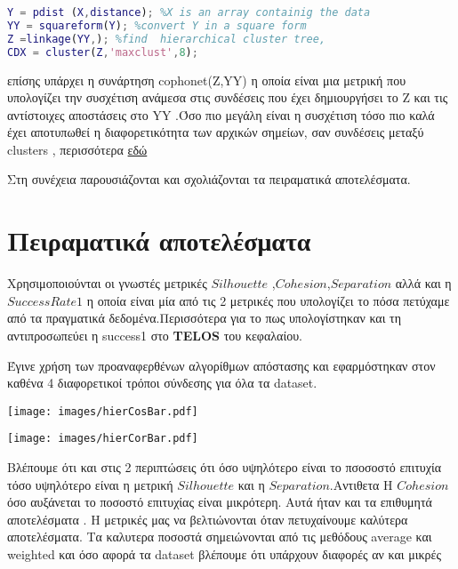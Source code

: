 \begin{lstlisting}[language=Matlab]
%simple example of hierarchical clustering
Y = pdist (X,distance); %X is an array containig the data
YY = squareform(Y); %convert Y in a square form
Z =linkage(YY,); %find  hierarchical cluster tree,
CDX = cluster(Z,'maxclust',8);
\end{lstlisting}


επίσης υπάρχει η συνάρτηση cophonet(Z,YY) η οποία είναι μια μετρική που υπολογίζει την συσχέτιση ανάμεσα στις συνδέσεις που έχει δημιουργήσει το Z και τις αντίστοιχες αποστάσεις στο YY .Όσο πιο μεγάλη είναι η συσχέτιση τόσο πιο καλά έχει αποτυπωθεί η διαφορετικότητα των αρχικών σημείων, σαν συνδέσεις μεταξύ clusters , περισσότερα
\href{https://en.wikipedia.org/wiki/Cophenetic_correlation}{εδώ}

Στη συνέχεια παρουσιάζονται και σχολιάζονται τα πειραματικά αποτελέσματα.

\section{Πειραματικά αποτελέσματα}

Χρησιμοποιούνται οι γνωστές μετρικές $Silhouette$ ,$Cohesion$,$Separation$
αλλά και η $Success Rate 1$ η οποία είναι μία από τις 2 μετρικές που  υπολογίζει το πόσα πετύχαμε από τα πραγματικά δεδομένα.Περισσότερα για το πως υπολογίστηκαν και τη αντιπροσωπεύει η success1 στο \textbf{TELOS} του κεφαλαίου.    

Έγινε χρήση των προαναφερθένων  αλγορίθμων απόστασης και εφαρμόστηκαν στον καθένα 4 διαφορετικοί τρόποι σύνδεσης για όλα τα dataset.

\noindent\begin{minipage}{\linewidth}
    \texttt{[image: images/hierCosBar.pdf]}
    \label{fig:CosineHier}
\end{minipage}

\noindent\begin{minipage}{\linewidth}
    \texttt{[image: images/hierCorBar.pdf]}
    \label{fig:CorrelationHier}
\end{minipage}

\newpage
Βλέπουμε ότι και στις 2 περιπτώσεις ότι όσο υψηλότερο είναι το πσοσοστό επιτυχία
τόσο υψηλότερο είναι  η μετρική $Silhouette$ και η $Separation$.Αντιθετα H $Cohesion$ όσο αυξάνεται το ποσοστό επιτυχίας είναι μικρότερη. Αυτά ήταν και τα επιθυμητά αποτελέσματα . Η μετρικές μας να βελτιώνονται όταν πετυχαίνουμε καλύτερα αποτελέσματα. 
Τα καλυτερα ποσοστά σημειώνονται από τις μεθόδους average και weighted
και όσο αφορά τα dataset βλέπουμε ότι υπάρχουν διαφορές αν και μικρές

